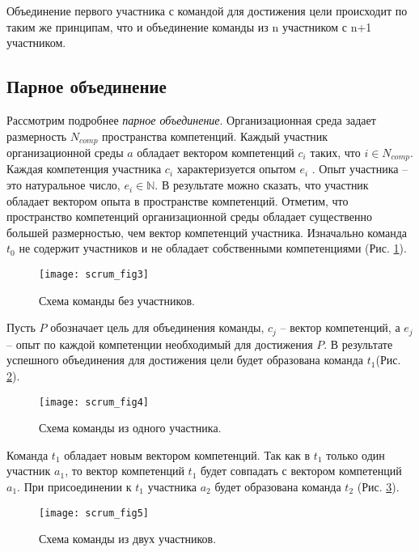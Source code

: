\begin{state} \label{state:3} 
Объединение первого участника с командой
для достижения цели происходит по таким же принципам, что и объединение
команды из n участником с n+1 участником. 
\end{state}

\subsection{Парное объединение}

Рассмотрим подробнее \emph{парное объединение}. 
Организационная среда задает размерность $N_{comp}$ пространства компетенций. 
Каждый участник организационной среды $a$ обладает вектором компетенций $c_i$ таких, что $i \in N_{comp}$. 
Каждая компетенция участника $c_i$ характеризуется опытом $e_i$ . 
Опыт участника -- это натуральное число, $e_i \in \mathbb{N}$. 
В результате можно сказать, что  участник обладает вектором опыта в пространстве компетенций. 
Отметим, что пространство компетенций организационной среды обладает существенно большей размерностью, чем вектор компетенций участника.
Изначально команда $t_0$ не содержит участников и не обладает собственными компетенциями (Рис. \ref{ex:fig3}).

\begin{figure}[H]
  \centering
    \texttt{[image: scrum\_fig3]}
  \label{ex:fig3}
  \caption{Схема команды без участников.}
\end{figure}

Пусть $P$ обозначает цель для объединения команды, $c_j$ -- вектор компетенций, а $e_j$ -- опыт по каждой компетенции необходимый для достижения $P$. 
В результате успешного объединения для достижения цели будет образована команда $t_1$(Рис. \ref{ex:fig4}).

\begin{figure}[H]
  \centering
    \texttt{[image: scrum\_fig4]}
  \label{ex:fig4}
  \caption{Схема команды из одного участника.}
\end{figure} 

Команда $t_1$ обладает новым вектором компетенций. 
Так как в $t_1$ только один участник $a_1$, то вектор компетенций $t_1$ будет совпадать с вектором компетенций $a_1$. 
При присоединении к  $t_1$ участника $a_2$ будет образована команда $t_2$ (Рис. \ref{ex:fig5}).

\begin{figure}[H]
  \centering
    \texttt{[image: scrum\_fig5]}
  \label{ex:fig5}
  \caption{Схема команды из двух участников.}
\end{figure} 


